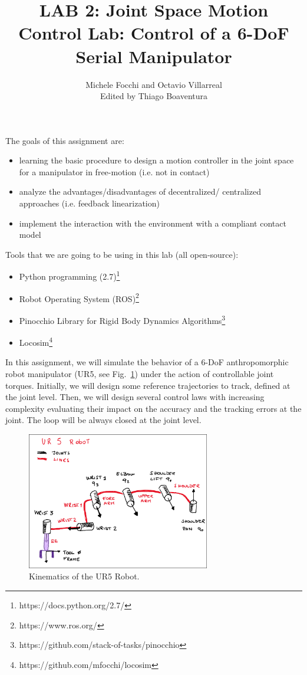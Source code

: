 \documentclass[11pt]{article}
\title{LAB 2: Joint Space Motion Control Lab: Control of a 6-DoF Serial Manipulator}
\author{Michele Focchi and Octavio Villarreal \\
Edited by Thiago Boaventura}
\date{}
\begin{document}
	\maketitle
	\noindent
	The goals of this assignment are:
	\begin{itemize}
		\item learning the basic procedure to design a motion controller in the joint space for a manipulator in free-motion (i.e. not in contact)
		\item analyze the advantages/disadvantages of decentralized/ centralized approaches (i.e. feedback linearization)
		\item implement the interaction with the environment with a compliant contact model	 
	\end{itemize}
	
	\noindent
	Tools that we are going to be using in this lab (all open-source):
	\begin{itemize}
		\item Python programming (2.7)\footnote{https://docs.python.org/2.7/}
		\item Robot Operating System (ROS)\footnote{https://www.ros.org/}
		\item Pinocchio Library for Rigid Body Dynamics Algorithms\footnote{https://github.com/stack-of-tasks/pinocchio}
		\item Locosim\footnote{https://github.com/mfocchi/locosim}
	\end{itemize}
	In this assignment, we will simulate the behavior of a 6-DoF anthropomorphic robot manipulator (UR5, see  Fig.~\ref{fig:UR5}) under the action of controllable joint torques. Initially, we will design some reference trajectories to track, defined at the joint level. Then, we will design several control laws with increasing complexity evaluating their impact on the accuracy and the tracking errors at the joint. The loop will be always closed at the joint level.  
 
 \begin{figure}[bht]
 	\centering
 	\includegraphics[width=8cm]{ur5_Robot.pdf}
 	\caption{Kinematics of the UR5 Robot.}
 	\label{fig:UR5}
 \end{figure}
\end{document}
